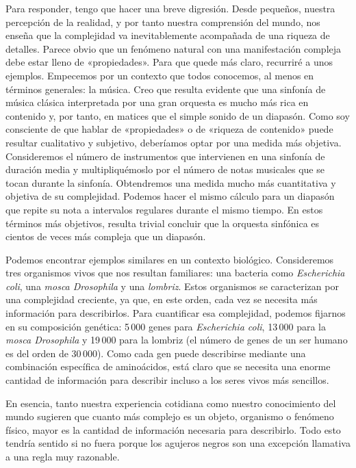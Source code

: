 Para responder, tengo que hacer una breve digresión. Desde pequeños, nuestra percepción de la realidad, y por tanto nuestra comprensión del mundo, nos enseña que la complejidad va inevitablemente acompañada de una riqueza de detalles. Parece obvio que un fenómeno natural con una manifestación compleja debe estar lleno de «propiedades». Para que quede más claro, recurriré a unos ejemplos. Empecemos por un contexto que todos conocemos, al menos en términos generales: la música. Creo que resulta evidente que una sinfonía de música clásica interpretada por una gran orquesta es mucho más rica en contenido y, por tanto, en matices que el simple sonido de un diapasón. Como soy consciente de que hablar de «propiedades» o de «riqueza de contenido» puede resultar cualitativo y subjetivo, deberíamos optar por una medida más objetiva. Consideremos el número de instrumentos que intervienen en una sinfonía de duración media y multipliquémoslo por el número de notas musicales que se tocan durante la sinfonía. Obtendremos una medida mucho más cuantitativa y objetiva de su complejidad. Podemos hacer el mismo cálculo para un diapasón que repite su nota a intervalos regulares durante el mismo tiempo. En estos términos más objetivos, resulta trivial concluir que la orquesta sinfónica es cientos de veces más compleja que un diapasón.

Podemos encontrar ejemplos similares en un contexto biológico. Consideremos tres organismos vivos que nos resultan familiares: una bacteria como \emph{Escherichia coli}, una \emph{mosca Drosophila} y una \emph{lombriz}. Estos organismos se caracterizan por una complejidad creciente, ya que, en este orden, cada vez se necesita más información para describirlos. Para cuantificar esa complejidad, podemos fijarnos en su composición genética: 5\,000 genes para \emph{Escherichia coli}, 13\,000 para la \emph{mosca Drosophila} y 19\,000 para la lombriz (el número de genes de un ser humano es del orden de 30\,000). Como cada gen puede describirse mediante una combinación específica de aminoácidos, está claro que se necesita una enorme cantidad de información para describir incluso a los seres vivos más sencillos.

En esencia, tanto nuestra experiencia cotidiana como nuestro conocimiento del mundo sugieren que cuanto más complejo es un objeto, organismo o fenómeno físico, mayor es la cantidad de información necesaria para describirlo. Todo esto tendría sentido si no fuera porque los agujeros negros son una excepción llamativa a una regla muy razonable.

